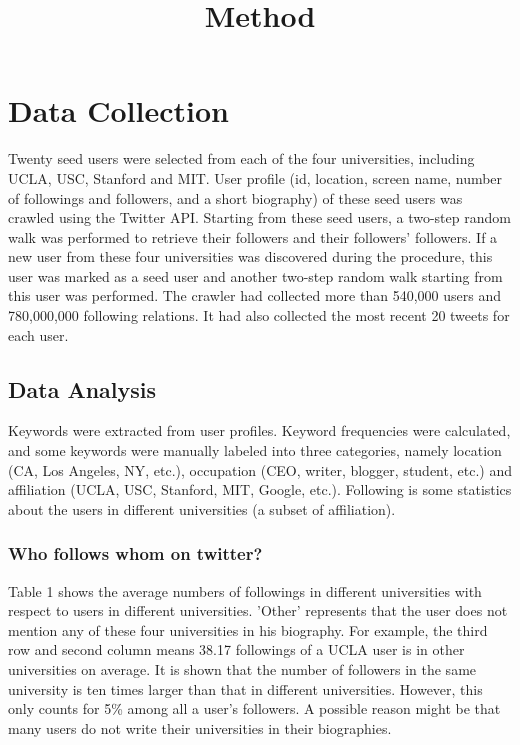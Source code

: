 \documentclass{article}
\begin{document}
\title{Method}
\maketitle \else \fi

\section{Data Collection}\label{sec:datacollection}
Twenty seed users were selected from each of the four universities, including UCLA, USC, Stanford and MIT. User profile (id, location, screen name, number of followings and followers, and a short biography) of these seed users was crawled using the Twitter API. Starting from these seed users, a two-step random walk was performed to retrieve their followers and their followers' followers. If a new user from these four universities was discovered during the procedure, this user was marked as a seed user and another two-step random walk starting from this user was performed. The crawler had collected more than 540,000 users and 780,000,000 following relations. It had also collected the most recent 20 tweets for each user.

\subsection{Data Analysis}
Keywords were extracted from user profiles. Keyword frequencies were calculated, and some keywords were manually labeled into three categories, namely location (CA, Los Angeles, NY, etc.), occupation (CEO, writer, blogger, student, etc.) and affiliation (UCLA, USC, Stanford, MIT, Google, etc.). Following is some statistics about the users in different universities (a subset of affiliation).

\subsubsection{Who follows whom on twitter?}
Table 1 shows the average numbers of followings in different universities with respect to users in different universities. 'Other' represents that the user does not mention any of these four universities in his biography. For example, the third row and second column means 38.17 followings of a UCLA user is in other universities on average. It is shown that the number of followers in the same university is ten times larger than that in different universities. However, this only counts for 5\% among all a user's followers. A possible reason might be that many users do not write their universities in their biographies.
\end{document}
